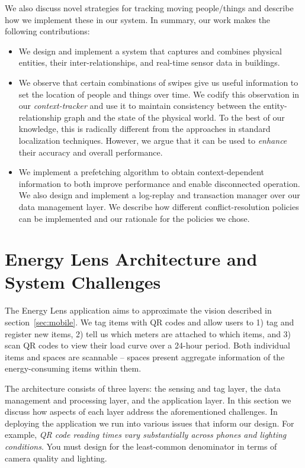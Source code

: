 We also discuss novel strategies for tracking moving people/things and describe how we implement these in our system.  In summary, our work
makes the following contributions:

\begin{itemize}
\item We design and implement a system that captures and combines physical entities, their inter-relationships, and real-time sensor data 
		in buildings.%
\item We observe that certain combinations of swipes give us useful information to set the location of people and things over time.
		We codify this observation in our \emph{context-tracker} and use it to maintain consistency between the entity-relationship graph and the 
		state of the physical world.  To the best of our knowledge, this is radically different from the approaches in standard 
		localization techniques.  However, we argue that it can be used to \emph{enhance} their accuracy and overall performance.
\item We implement a prefetching algorithm to obtain context-dependent information to both improve performance and
		enable disconnected operation.  We also design and implement a log-replay and transaction manager over our data management layer.  We describe how different conflict-resolution policies can be implemented and our rationale for the policies we chose.
\end{itemize}

\vspace{0.08in}



\section{Energy Lens Architecture and System Challenges}
The Energy Lens application aims to approximate the vision described in section~\ref{sec:mobile}.  We tag
items with QR codes and allow users to 1) tag and register new items, 
2) tell us which meters are attached to which items, and 3) scan QR codes to view their load curve over a 
24-hour period.  Both individual items and spaces are scannable -- spaces present aggregate information
of the energy-consuming items within them.

The architecture consists of three layers: the sensing and tag layer, the data management and processing layer, and the application
layer.  In this section we discuss how aspects of each layer address the aforementioned challenges.
In deploying the application we run into various issues that inform our design.  
For example, \emph{QR code reading times vary substantially across phones
and lighting conditions}.  You must design for the least-common denominator in terms of camera quality and lighting.

